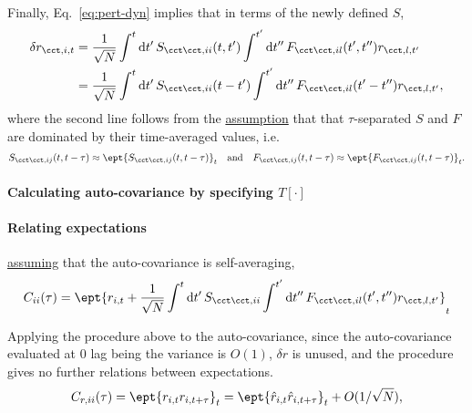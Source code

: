 \documentclass[11pt,openany,oneside]{article} %
\begin{document}
Finally, Eq.~\ref{eq:pert-dyn} implies that in terms of the newly defined $S$,
\begin{equation}
  \label{eq:pert-sol}
  \begin{aligned}
    \delta r_{\cct,i,t} &= \frac{1}{\sqrt{N}}\int^t\d t'\,S_{\cct\cct,ii}(t,t') \int^{t'}\d t''\,F_{\cct\cct,il}(t',t'') r_{\cct,l,t'}\\
  &= \frac{1}{\sqrt{N}}\int^t\d t'\,S_{\cct\cct,ii}(t-t') \int^{t'}\d t''\,F_{\cct\cct,il}(t'-t'') r_{\cct,l,t'},
  \end{aligned}
\end{equation}
where the second line follows from the \uline{assumption} that that $\tau$-separated $S$ and $F$ are
dominated by their time-averaged values, i.e.
\begin{align*}
  S_{\cct\cct,ij}(t,t-\tau) \approx \ept{S_{\cct\cct,ij}(t,t-\tau)}_t\tand F_{\cct\cct,ij}(t,t-\tau) \approx \ept{F_{\cct\cct,ij}(t,t-\tau)}_t.
\end{align*}

\paragraph{Calculating auto-covariance by specifying $T[\cdot]$}


\paragraph{Relating expectations}



\uline{assuming} that the auto-covariance is self-averaging,
\begin{equation}
  \label{eq:auto-cov}
  C_{ii}(\tau) = \ept{r_{i,t}+\frac{1}{\sqrt{N}}\int^t\d t'\,S_{\cct\cct,ii} \int^{t'}\d t''\,F_{\cct\cct,il}(t',t'') r_{\cct,l,t'}}_t
\end{equation}


Applying the procedure above to the auto-covariance, since the auto-covariance evaluated at $0$ lag
being the variance is $O(1)$, $\delta r$ is unused, and the procedure gives no further relations
between expectations.
\begin{align*}
  C_{r,ii}(\tau) = \ept{r_{i,t}r_{i,t+\tau}}_t = \ept{\hat{r}_{i,t}\hat{r}_{i,t+\tau}}_t + O(1/\sqrt{N}),
\end{align*}
\end{document}
